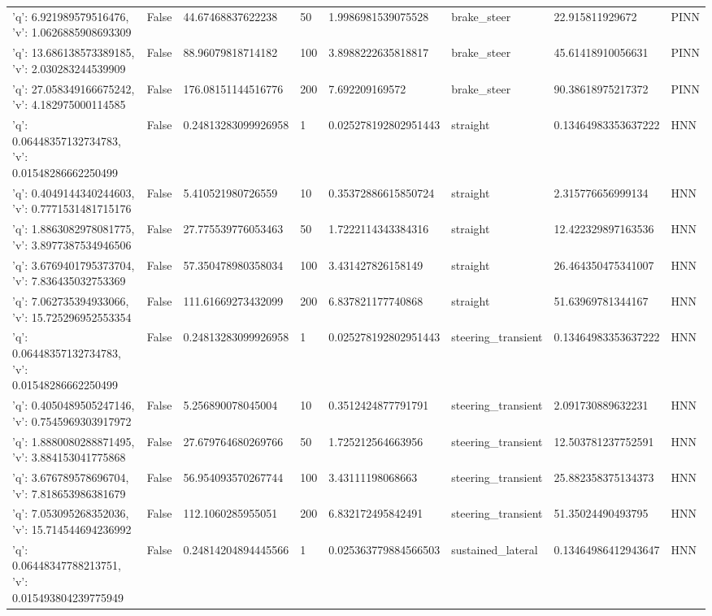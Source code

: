 \begin{tabular}{llllllll}
{'q': 6.921989579516476, 'v': 1.0626885908693309} & False & 44.67468837622238 & 50 & 1.9986981539075528 & brake\_steer & 22.915811929672 & PINN \\
{'q': 13.686138573389185, 'v': 2.030283244539909} & False & 88.96079818714182 & 100 & 3.8988222635818817 & brake\_steer & 45.61418910056631 & PINN \\
{'q': 27.058349166675242, 'v': 4.182975000114585} & False & 176.08151144516776 & 200 & 7.692209169572 & brake\_steer & 90.38618975217372 & PINN \\
{'q': 0.06448357132734783, 'v': 0.01548286662250499} & False & 0.24813283099926958 & 1 & 0.025278192802951443 & straight & 0.13464983353637222 & HNN \\
{'q': 0.4049144340244603, 'v': 0.7771531481715176} & False & 5.410521980726559 & 10 & 0.35372886615850724 & straight & 2.315776656999134 & HNN \\
{'q': 1.8863082978081775, 'v': 3.8977387534946506} & False & 27.775539776053463 & 50 & 1.7222114343384316 & straight & 12.422329897163536 & HNN \\
{'q': 3.6769401795373704, 'v': 7.836435032753369} & False & 57.350478980358034 & 100 & 3.431427826158149 & straight & 26.464350475341007 & HNN \\
{'q': 7.062735394933066, 'v': 15.725296952553354} & False & 111.61669273432099 & 200 & 6.837821177740868 & straight & 51.63969781344167 & HNN \\
{'q': 0.06448357132734783, 'v': 0.01548286662250499} & False & 0.24813283099926958 & 1 & 0.025278192802951443 & steering\_transient & 0.13464983353637222 & HNN \\
{'q': 0.4050489505247146, 'v': 0.7545969303917972} & False & 5.256890078045004 & 10 & 0.3512424877791791 & steering\_transient & 2.091730889632231 & HNN \\
{'q': 1.8880080288871495, 'v': 3.884153041775868} & False & 27.679764680269766 & 50 & 1.725212564663956 & steering\_transient & 12.503781237752591 & HNN \\
{'q': 3.676789578696704, 'v': 7.818653986381679} & False & 56.954093570267744 & 100 & 3.43111198068663 & steering\_transient & 25.882358375134373 & HNN \\
{'q': 7.053095268352036, 'v': 15.714544694236992} & False & 112.1060285955051 & 200 & 6.832172495842491 & steering\_transient & 51.35024490493795 & HNN \\
{'q': 0.06448347788213751, 'v': 0.015493804239775949} & False & 0.24814204894445566 & 1 & 0.025363779884566503 & sustained\_lateral & 0.13464986412943647 & HNN \\

\end{tabular}
